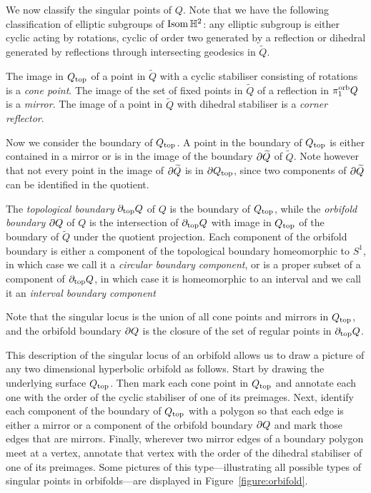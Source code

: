 We now classify the singular points of $Q$.
Note that we have the following classification of elliptic subgroups of $\operatorname{\mathrm{Isom}}\mathbb{H}^2$: any elliptic subgroup is either cyclic acting by rotations, cyclic of order two generated by a reflection or dihedral generated by reflections through intersecting geodesics in $\widetilde{Q}$.

\begin{definition}
  The image in $Q_{\mathrm{top}}$ of a point in $\widetilde{Q}$ with a cyclic stabiliser consisting of rotations is a \emph{cone point}.
  The image of the set of fixed points in $\widetilde{Q}$ of a reflection in $\pi_1^{\mathrm{orb}} Q$ is a \emph{mirror}.
  The image of a point in $\widetilde{Q}$ with dihedral stabiliser is a \emph{corner reflector}.
\end{definition}

Now we consider the boundary of $Q_{\mathrm{top}}$. 
A point in the boundary of $Q_{\mathrm{top}}$ is either contained in a mirror or is in the image of the boundary $\partial\widetilde{Q}$ of $\widetilde{Q}$.
Note however that not every point in the image of $\partial\widetilde{Q}$ is in $\partial Q_{\mathrm{top}}$, since two components of $\partial\widetilde{Q}$ can be identified in the quotient.

\begin{definition}
  The \emph{topological boundary} $\partial_{\mathrm{top}} Q$ of $Q$ is the boundary of $Q_{\mathrm{top}}$, while the \emph{orbifold boundary} $\partial Q$ of $Q$ is the intersection of $\partial_{\mathrm{top}} Q$ with image in $Q_{\mathrm{top}}$ of the boundary of $\widetilde{Q}$ under the quotient projection. 
  Each component of the orbifold boundary is either a component of the topological boundary homeomorphic to $S^1$, in which case we call it a \emph{circular boundary component}, or is a proper subset of a component of $\partial_{\mathrm{top}} Q$, in which case it is homeomorphic to an interval and we call it an \emph{interval boundary component}
\end{definition}

Note that the singular locus is the union of all cone points and mirrors in $Q_{\mathrm{top}}$, and the orbifold boundary $\partial Q$ is the closure of the set of regular points in $\partial_{\mathrm{top}} Q$.

This description of the singular locus of an orbifold allows us to draw a picture of any two dimensional hyperbolic orbifold as follows. 
Start by drawing the underlying surface $Q_{\mathrm{top}}$.
Then mark each cone point in $Q_{\mathrm{top}}$ and annotate each one with the order of the cyclic stabiliser of one of its preimages.
Next, identify each component of the boundary of $Q_{\mathrm{top}}$ with a polygon so that each edge is either a mirror or a component of the orbifold boundary $\partial Q$ and mark those edges that are mirrors.
Finally, wherever two mirror edges of a boundary polygon meet at a vertex, annotate that vertex with the order of the dihedral stabiliser of one of its preimages.
Some pictures of this type---illustrating all possible types of singular points in orbifolds---are displayed in Figure~\ref{figure:orbifold}.

